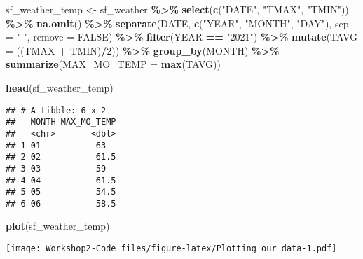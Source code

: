 \documentclass[
]{article}
\newenvironment{Shaded}{\begin{snugshade}}{\end{snugshade}}
\newcommand{\AttributeTok}[1]{\textcolor[rgb]{0.13,0.29,0.53}{#1}}
\newcommand{\ConstantTok}[1]{\textcolor[rgb]{0.56,0.35,0.01}{#1}}
\newcommand{\DecValTok}[1]{\textcolor[rgb]{0.00,0.00,0.81}{#1}}
\newcommand{\FunctionTok}[1]{\textcolor[rgb]{0.13,0.29,0.53}{\textbf{#1}}}
\newcommand{\NormalTok}[1]{#1}
\newcommand{\OtherTok}[1]{\textcolor[rgb]{0.56,0.35,0.01}{#1}}
\newcommand{\SpecialCharTok}[1]{\textcolor[rgb]{0.81,0.36,0.00}{\textbf{#1}}}
\newcommand{\StringTok}[1]{\textcolor[rgb]{0.31,0.60,0.02}{#1}}
\begin{document}
\begin{Shaded}
\begin{Highlighting}[]
\NormalTok{sf\_weather\_temp }\OtherTok{\textless{}{-}}\NormalTok{ sf\_weather }\SpecialCharTok{\%\textgreater{}\%} 
  \FunctionTok{select}\NormalTok{(}\FunctionTok{c}\NormalTok{(}\StringTok{"DATE"}\NormalTok{, }\StringTok{"TMAX"}\NormalTok{, }\StringTok{"TMIN"}\NormalTok{)) }\SpecialCharTok{\%\textgreater{}\%} 
  \FunctionTok{na.omit}\NormalTok{() }\SpecialCharTok{\%\textgreater{}\%} 
  \FunctionTok{separate}\NormalTok{(DATE, }\FunctionTok{c}\NormalTok{(}\StringTok{"YEAR"}\NormalTok{, }\StringTok{"MONTH"}\NormalTok{, }\StringTok{"DAY"}\NormalTok{), }\AttributeTok{sep =} \StringTok{"{-}"}\NormalTok{, }\AttributeTok{remove =} \ConstantTok{FALSE}\NormalTok{) }\SpecialCharTok{\%\textgreater{}\%} 
  \FunctionTok{filter}\NormalTok{(YEAR }\SpecialCharTok{==} \StringTok{"2021"}\NormalTok{) }\SpecialCharTok{\%\textgreater{}\%} 
  \FunctionTok{mutate}\NormalTok{(}\AttributeTok{TAVG =}\NormalTok{ ((TMAX }\SpecialCharTok{+}\NormalTok{ TMIN)}\SpecialCharTok{/}\DecValTok{2}\NormalTok{)) }\SpecialCharTok{\%\textgreater{}\%} 
  \FunctionTok{group\_by}\NormalTok{(MONTH) }\SpecialCharTok{\%\textgreater{}\%} 
  \FunctionTok{summarize}\NormalTok{(}\AttributeTok{MAX\_MO\_TEMP =} \FunctionTok{max}\NormalTok{(TAVG))}
  
\FunctionTok{head}\NormalTok{(sf\_weather\_temp)}
\end{Highlighting}
\end{Shaded}

\begin{verbatim}
## # A tibble: 6 x 2
##   MONTH MAX_MO_TEMP
##   <chr>       <dbl>
## 1 01           63  
## 2 02           61.5
## 3 03           59  
## 4 04           61.5
## 5 05           54.5
## 6 06           58.5
\end{verbatim}

\begin{Shaded}
\begin{Highlighting}[]
\FunctionTok{plot}\NormalTok{(sf\_weather\_temp)}
\end{Highlighting}
\end{Shaded}

\texttt{[image: Workshop2-Code\_files/figure-latex/Plotting our data-1.pdf]}
\end{document}
